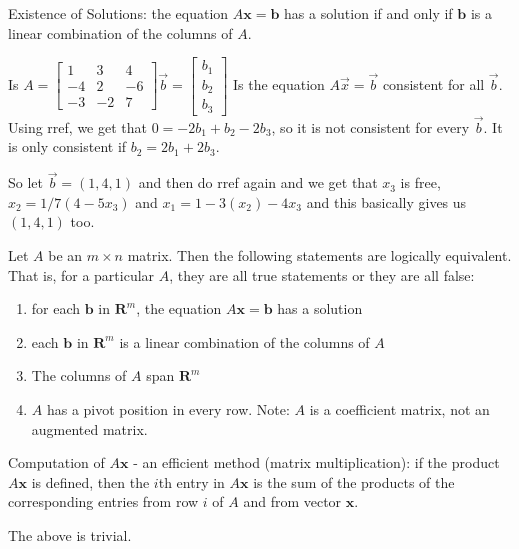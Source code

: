 \documentclass[../linalg.tex]{subfiles}
\begin{document}
Existence of Solutions: the equation $A\textbf{x}=\textbf{b}$ has a solution if and only if $\textbf{b}$ is a linear combination of the columns of $A$.

\begin{example}
    Is $A=\begin{bmatrix}
        1 & 3 & 4 \\ 
        -4 & 2 & -6 \\ 
        -3 & -2 & 7
    \end{bmatrix} \vec{b}=\begin{bmatrix}
        b_1 \\ b_2 \\ b_3
    \end{bmatrix}$ Is the equation $A\vec{x}=\vec{b}$ consistent for all $\vec{b}$. Using rref, we get that $0=-2b_1+b_2-2b_3$, so it is not consistent for every $\vec{b}$. It is only consistent if $b_2=2b_1+2b_3$.

So let $\vec{b}=(1,4,1)$ and then do rref again and we get that $x_3$ is free, $x_2=1/7(4-5x_3)$ and $x_1=1-3(x_2)-4x_3$ and this basically gives us $(1,4,1)$ too.
\end{example}

\begin{theorem}[Existence of soultion for $A\textbf{x}=\textbf{b}$]
    Let $A$ be an $m\times n$ matrix. Then the following statements are logically equivalent. That is, for a particular $A$, they are all true statements or they are all false:
    \begin{enumerate}
        \item for each $\textbf{b}$ in $\textbf{R}^m$, the equation $A\textbf{x}=\textbf{b}$ has a solution 
        \item each $\textbf{b}$ in $\textbf{R}^m$ is a linear combination of the columns of $A$
        \item The columns of $A$ span $\textbf{R}^m$
        \item $A$ has a pivot position in every row. Note: $A$ is a coefficient matrix, not an augmented matrix.
    \end{enumerate}
\end{theorem}

Computation of $A\textbf{x}$ - an efficient method (matrix multiplication): if the product $A\textbf{x}$ is defined, then the $i$th entry in $A\textbf{x}$ is the sum of the products of the corresponding entries from row $i$ of $A$ and from vector $\textbf{x}$.

The above is trivial.
\end{document}
